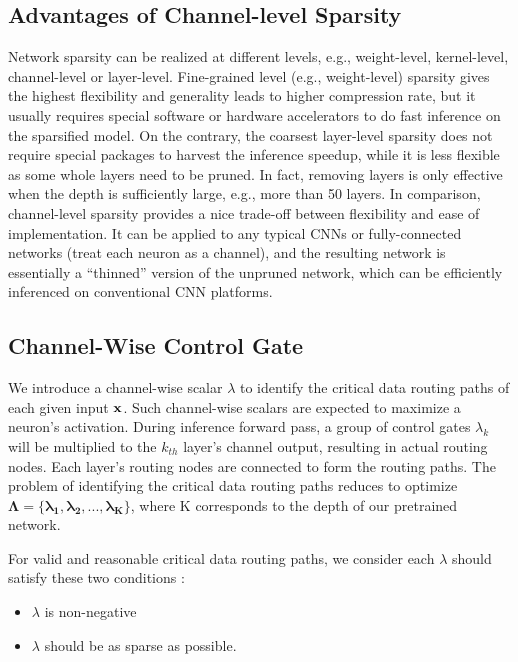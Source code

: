 \documentclass[conference]{IEEEtran}
\begin{document}
\subsection{Advantages of Channel-level Sparsity}
Network sparsity can be realized at different levels\cite{Liu_2017_ICCV}, e.g., weight-level, kernel-level, channel-level or layer-level. Fine-grained level (e.g., weight-level) sparsity gives the highest flexibility and generality leads to higher compression rate, but it usually requires special software or hardware accelerators to do fast inference on the sparsified model. On the contrary, the coarsest layer-level sparsity does not require special packages to harvest the inference speedup, while it is less flexible as some whole layers need to be pruned. In fact, removing layers is only effective when the depth is sufficiently large, e.g., more than 50 layers. In comparison, channel-level sparsity provides a nice trade-off between flexibility and ease of implementation. It can be applied to any typical CNNs or fully-connected networks (treat each neuron as a channel), and the resulting network is essentially a “thinned” version of the unpruned network, which can be efficiently inferenced on conventional CNN platforms.

\subsection{Channel-Wise Control Gate}
We introduce a channel-wise scalar $\lambda$ to identify the critical data routing paths of each given input $\bf x$. Such channel-wise scalars are expected to maximize a neuron's activation. During inference forward pass, a group of control gates $\lambda_k$ will be multiplied to the $k_{th}$ layer's channel output, resulting in actual routing nodes. Each layer's routing nodes are connected to form the routing paths. The problem of identifying the critical data routing paths reduces to optimize $\bm{\Lambda} = \{ \bm{\lambda_1, \lambda_2, ..., \lambda_K} \}$, where K corresponds to the depth of our pretrained network.

For valid and reasonable critical data routing paths, we consider each $\lambda$ should satisfy these two conditions \cite{Wang_2018_CVPR}: 
\begin{itemize}
\item $\lambda$ is non-negative
\item $\lambda$ should be as sparse as possible.
\end{itemize}
\end{document}
